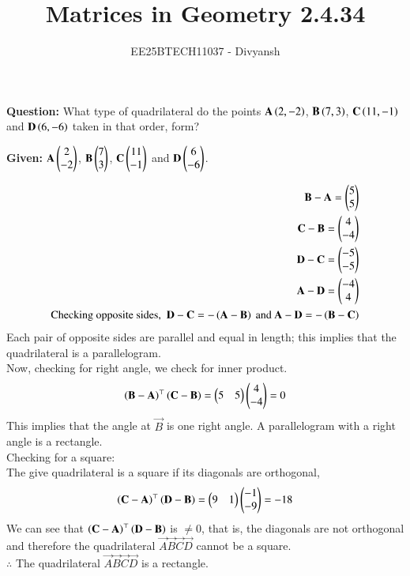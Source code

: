 \documentclass[journal,12pt,onecolumn]{IEEEtran}
\title{Matrices in Geometry 2.4.34}
\author{EE25BTECH11037 - Divyansh}
\theoremstyle{remark}
\begin{document}
\vspace{3cm}
\maketitle
{\let\newpage\relax\maketitle}
\textbf{Question: }
What type of quadrilateral do the points $\mathbf{A}\left(2,-2\right)$, $\mathbf{B}\left(7,3\right)$, $\mathbf{C}\left(11,-1\right)$ and $\mathbf{D}\left(6,-6\right)$ taken in that order, form?


\textbf{Given: } $\mathbf{A}\begin{pmatrix}2\\-2\end{pmatrix}$, $\mathbf{B}\begin{pmatrix}7\\3\end{pmatrix}$, $\mathbf{C}\begin{pmatrix}11 \\ -1\end{pmatrix}$ and $\mathbf{D}\begin{pmatrix}6 \\ -6\end{pmatrix}$.
 

\begin{align}
    \vec{B}- \vec{A}=\myvec{5 \\ 5} \\
    \vec{C}- \vec{B}=\myvec{4 \\ -4} \\
    \vec{D}- \vec{C}=\myvec{-5 \\ -5} \\
    \vec{A}- \vec{D}=\myvec{-4 \\ 4} \\
    \text{Checking opposite sides, } \ \vec{D}-\vec{C}=-\brak{\vec{A}-\vec{B}} \text{ and } \vec{A}-\vec{D}=-\brak{\vec{B}-\vec{C}}
\end{align}
Each pair of opposite sides are parallel and equal in length; this implies that the quadrilateral is a parallelogram.\\
Now, checking for right angle, we check for inner product.
\begin{align}
 \left(\mathbf{B}- \mathbf{A}\right)^{\top} \left(\mathbf{C}- \mathbf{B}\right)=\begin{pmatrix}5 & 5\end{pmatrix}\begin{pmatrix}4 \\ -4\end{pmatrix}=0
\end{align}
This implies that the angle at $\vec{B}$ is one right angle. A parallelogram with a right angle is a rectangle.\\
Checking for a square:\\
The give quadrilateral is a square if its diagonals are orthogonal,
\begin{align}
\left(\mathbf{C}- \mathbf{A}\right)^{\top} \left(\mathbf{D}- \mathbf{B}\right)=\begin{pmatrix}9 & 1\end{pmatrix}\begin{pmatrix}-1 \\ -9\end{pmatrix}=-18
\end{align}
We can see that $\left(\mathbf{C}- \mathbf{A}\right)^{\top} \left(\mathbf{D}- \mathbf{B}\right)$ is $\neq 0$, that is, the diagonals are not orthogonal and therefore the quadrilateral $\vec{A}\vec{B}\vec{C}\vec{D}$ cannot be a square.\\
$\therefore$ The quadrilateral $\vec{A}\vec{B}\vec{C}\vec{D}$ is a rectangle.
\end{document}
